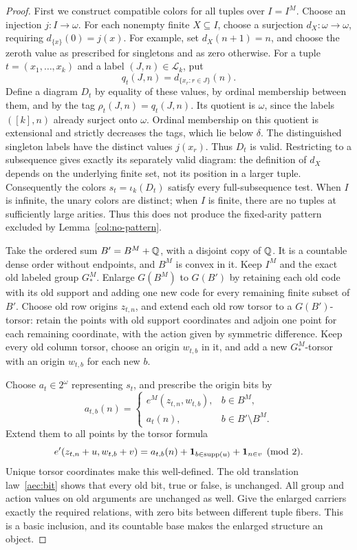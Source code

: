 \begin{proof}
First we construct compatible colors for all tuples over \(I=I^M\).
Choose an injection \(j:I\to\omega\). For each nonempty finite
\(X\subseteq I\), choose a surjection \(d_X:\omega\to\omega\),
requiring \(d_{\{x\}}(0)=j(x)\). For example, set
\(d_X(n+1)=n\), and choose the zeroth value as prescribed for
singletons and as zero otherwise. For a tuple \(t=(x_1,\ldots,x_k)\)
and a label \((J,n)\in\mathcal L_k\), put
\[
 q_t(J,n)=d_{\{x_r:r\in J\}}(n).
\]
Define a diagram \(D_t\) by equality of these values, by ordinal
membership between them, and by the tag \(\rho_t(J,n)=q_t(J,n)\).
Its quotient is \(\omega\), since the labels \(([k],n)\) already
surject onto \(\omega\). Ordinal membership on this quotient is
extensional and strictly decreases the tags, which lie below
\(\delta\). The distinguished singleton labels have the distinct
values \(j(x_r)\). Thus \(D_t\) is valid. Restricting to a
subsequence gives exactly its separately valid diagram: the definition
of \(d_X\) depends on the underlying finite set, not its position in
a larger tuple. Consequently the colors
\(s_t=\iota_k(D_t)\) satisfy every full-subsequence test. When \(I\)
is infinite, the unary colors are distinct; when \(I\) is finite,
there are no tuples at sufficiently large arities. Thus this does not
produce the fixed-arity pattern excluded by Lemma~\ref{col:no-pattern}.

Take the ordered sum \(B'=B^M+\mathbb Q\), with a disjoint copy of \(\mathbb Q\).
It is a countable dense order without endpoints, and \(B^M\) is
convex in it. Keep \(I^M\) and the exact old labeled group \(G_*^M\).
Enlarge \(G(B^M)\) to \(G(B')\) by retaining each old code with
its old support and adding one new code for every remaining finite
subset of \(B'\). Choose old row origins \(z_{t,n}\), and extend
each old row torsor to a \(G(B')\)-torsor: retain the points with
old support coordinates and adjoin one point for each remaining
coordinate, with the action given by symmetric difference.
Keep every old column torsor, choose an origin
\(w_{t,b}\) in it, and add a new \(G_*^M\)-torsor with an origin
\(w_{t,b}\) for each new \(b\).

Choose \(a_t\in2^\omega\) representing \(s_t\), and prescribe the
origin bits by
\[
 a_{t,b}(n)=
 \begin{cases}
 e^M(z_{t,n},w_{t,b}),&b\in B^M,\\
 a_t(n),&b\in B'\setminus B^M.
 \end{cases}
\]
Extend them to all points by the torsor formula
\[
 e'(z_{t,n}+u,w_{t,b}+v)
 =a_{t,b}(n)+\boldsymbol1_{b\in\operatorname{supp}(u)}
             +\boldsymbol1_{n\in v}\pmod2.
\]
Unique torsor coordinates make this well-defined. The old translation
law~\eqref{aec:bit} shows that every old bit, true or false, is
unchanged. All group and action values on old arguments are unchanged
as well. Give the enlarged carriers exactly the required relations,
with zero bits between different tuple fibers. This is a basic
inclusion, and its countable base makes the enlarged structure an
object.


\end{proof}
